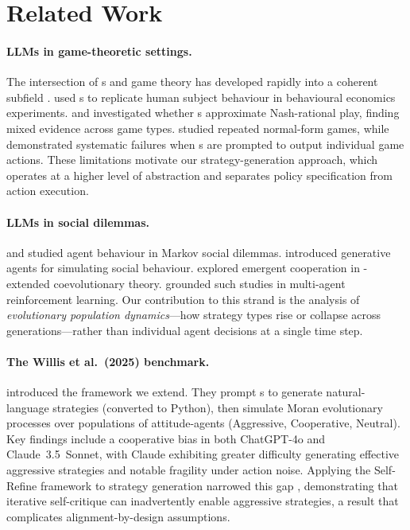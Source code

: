 \section{Related Work}
\label{sec:related}

\paragraph{LLMs in game-theoretic settings.}
The intersection of \LLM{}s and game theory has developed rapidly into a
coherent subfield \citep{Sun2025_survey}.
\citet{Aher2023_using} used \LLM{}s to replicate human subject behaviour in
behavioural economics experiments. \citet{Brookins2023_playing} and
\citet{Guo2023_gpt} investigated whether \LLM{}s approximate Nash-rational play,
finding mixed evidence across game types. \citet{Akata2025_repeated}
studied repeated normal-form games, while \citet{Fan2024_rational} demonstrated
systematic failures when \LLM{}s are prompted to output individual game actions.
These limitations motivate our strategy-generation approach, which operates at a
higher level of abstraction and separates policy specification from action
execution.

\paragraph{LLMs in social dilemmas.}
\citet{Yocum2023_mitigating} and \citet{Piatti2024_cooperate}
studied \LLM agent behaviour in Markov social dilemmas. \citet{Park2023_generative}
introduced generative agents for simulating social behaviour.
\citet{DeZarza2023_emergent} explored emergent cooperation in
\LLM-extended coevolutionary theory. \citet{Leibo2017_multiagent} grounded such
studies in multi-agent reinforcement learning. Our contribution to this strand is
the analysis of \emph{evolutionary population dynamics}---how strategy types rise
or collapse across generations---rather than individual agent decisions at a
single time step.

\paragraph{The Willis et al.\ (2025) benchmark.}
\citet{Willis2025_llm_ipd} introduced the framework we extend. They prompt
\LLM{}s to generate natural-language \IPD strategies (converted to Python), then
simulate Moran evolutionary processes over populations of attitude-agents
(Aggressive, Cooperative, Neutral). Key findings include a cooperative bias in
both ChatGPT-4o and Claude~3.5~Sonnet, with Claude exhibiting greater difficulty
generating effective aggressive strategies and notable fragility under action
noise. Applying the Self-Refine framework \citep{Madaan2023_self_refine} to strategy
generation narrowed this gap \citep{Willis2025_llm_ipd}, demonstrating that
iterative self-critique can inadvertently enable aggressive strategies, a result
that complicates alignment-by-design assumptions.

